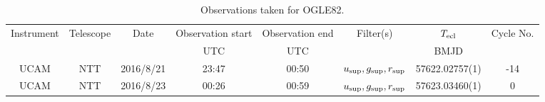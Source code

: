 \begin{table}
	\begin{center}
		\caption{Observations taken for OGLE82.}
		\label{table:observing:observation logs OGLE82}
		\begin{tabular}{cccccccc}
			\hline
			Instrument & Telescope & Date & Observation start & Observation end & Filter(s) & $T_{\rm ecl}$ & Cycle No. \\
			 &  &  & UTC & UTC &  & BMJD &  \\
			\hline
			\hline
			UCAM & NTT & 2016/8/21 & 23:47 & 00:50 & $u_{\rm sup},g_{\rm sup},r_{\rm sup}$ & 57622.02757(1)                                                                                                            &                                         -14 \\
			UCAM & NTT & 2016/8/23 & 00:26 & 00:59 & $u_{\rm sup},g_{\rm sup},r_{\rm sup}$ & 57623.03460(1)                                                                                                            &                                           0 \\
		   \hline
		\end{tabular}
	\end{center}
\end{table}